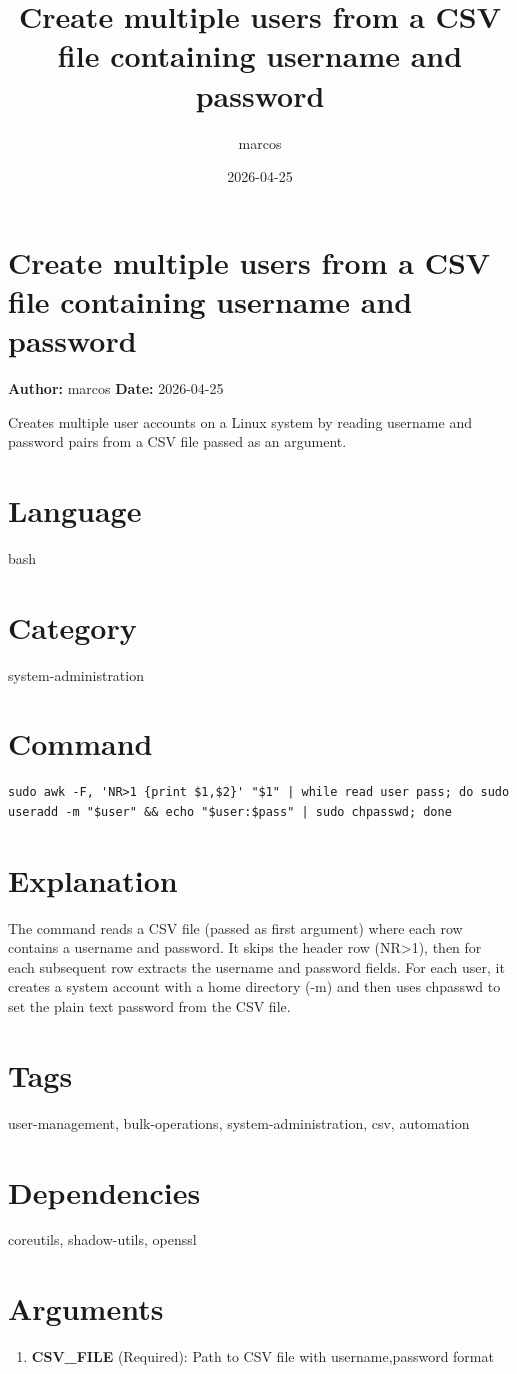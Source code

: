 \documentclass{article}
\title{Create multiple users from a CSV file containing username and password}
\author{marcos}
\date{2026-04-25}
\begin{document}
\section*{Create multiple users from a CSV file containing username and password}
\textbf{Author:} marcos \hfill \textbf{Date:} 2026-04-25

\noindent Creates multiple user accounts on a Linux system by reading username and password pairs from a CSV file passed as an argument.

\section*{Language}
bash

\section*{Category}
system-administration

\section*{Command}
\begin{lstlisting}
sudo awk -F, 'NR>1 {print $1,$2}' "$1" | while read user pass; do sudo useradd -m "$user" && echo "$user:$pass" | sudo chpasswd; done
\end{lstlisting}

\section*{Explanation}
The command reads a CSV file (passed as first argument) where each row contains a username and password. It skips the header row (NR>1), then for each subsequent row extracts the username and password fields. For each user, it creates a system account with a home directory (-m) and then uses chpasswd to set the plain text password from the CSV file.

\section*{Tags}
user-management, bulk-operations, system-administration, csv, automation

\section*{Dependencies}
coreutils, shadow-utils, openssl


\section*{Arguments}
\begin{enumerate}
  \item \textbf{CSV\_FILE} (Required): Path to CSV file with username,password format
\end{enumerate}
\end{document}
